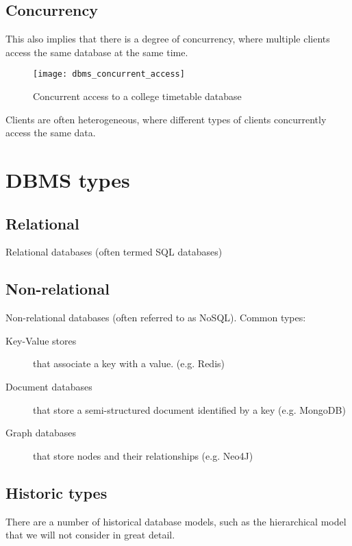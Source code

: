 \subsection{Concurrency}
\label{sec:concurrency}

This also implies that there is a degree of concurrency, where multiple
clients access the same database at the same time.

\begin{figure}[htbp]
  \centering
  \texttt{[image: dbms\_concurrent\_access]}
  \caption{Concurrent access to a college timetable database}
  \label{fig:concurrent-access}
\end{figure}

Clients are often heterogeneous, where different types of clients concurrently access the same data.


\section{DBMS types}


\subsection{Relational}

Relational databases (often termed SQL databases) 


\subsection{Non-relational}

Non-relational databases (often referred to as NoSQL).
Common types:
\begin{description}
\item[Key-Value stores] that associate a key with a value. (e.g. Redis)
\item[Document databases] that store a semi-structured document identified by a key (e.g. MongoDB)
\item[Graph databases] that store nodes and their relationships (e.g. Neo4J)
\end{description}


\subsection{Historic types}

There are a number of historical database models, such as the hierarchical model that we will not consider in great detail. 


